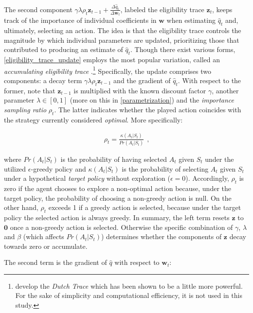 The second component $\gamma \lambda \rho_t \boldsymbol{z}_{t-1} + \frac{\Delta \hat{q}_t}{\Delta \boldsymbol{w}_t}$, labeled the eligibility trace $\boldsymbol{z}_t$, keeps track of the importance of individual coefficients in $\boldsymbol{w}$ when estimating $\hat{q}_t$ and, ultimately, selecting an action. The idea is that the eligibility trace controls the magnitude by which individual parameters are updated, prioritizing those that contributed to producing an estimate of $\hat{q}_t$. Though there exist various forms, \autoref{eligibility_trace_update} employs the most popular variation, called an \emph{accumulating eligibility trace} \parencite{sutton_learning_1988}.\footnote{\textcite{seijen_true_2014} develop the \emph{Dutch Trace} which has been shown to be a little more powerful. For the sake of simplicity and computational efficiency, it is not used in this study.} Specifically, the update comprises two components: a decay term $\gamma \lambda \rho_t \boldsymbol{z}_{t-1}$ and the gradient of $\hat{q}_t$. With respect to the former, note that $\boldsymbol{z}_{t-1}$ is multiplied with the known discount factor $\gamma$, another parameter $\lambda \in [0,1]$ (more on this in \autoref{parametrization}) and the \emph{importance sampling ratio} $\rho_t$. The latter indicates whether the played action coincides with the strategy currently considered \emph{optimal}. More specifically:

\begin{gather}
	 \rho_t = \frac{\kappa(A_t|S_{t})}{Pr(A_t|S_t)} ~~  \text{,}
\end{gather}

where $Pr(A_t|S_t)$ is the probability of having selected $A_t$ given $S_t$ under the utilized $\epsilon$-greedy policy and $\kappa(A_t|S_t)$ is the probability of selecting $A_t$ given $S_t$ under a hypothetical \emph{target policy} without exploration ($\epsilon = 0$). Accordingly, $\rho_t$ is zero if the agent chooses to explore a non-optimal action because, under the target policy, the probability of choosing a non-greedy action is null. On the other hand, $\rho_t$ exceeds 1 if a greedy action is selected, because under the target policy the selected action is always greedy. In summary, the left term resets $\boldsymbol{z}$ to $\boldsymbol{0}$ once a non-greedy action is selected. Otherwise  the specific combination of $\gamma$, $\lambda$ and $\beta$ (which affects $Pr(A_t|S_t)$) determines whether the components of $\boldsymbol{z}$ decay towards zero or accumulate.

The second term is the gradient of $\hat{q}$ with respect to $\boldsymbol{w}_t$:

